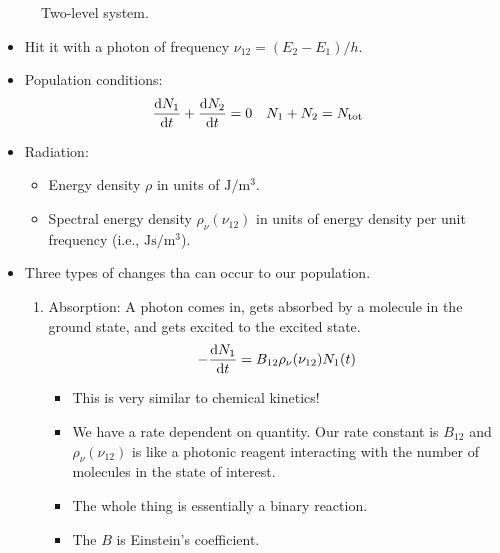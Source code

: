 \documentclass[../notes.tex]{subfiles}
\begin{document}
\begin{itemize}
\begin{figure}[h!]
        \caption{Two-level system.}
        \label{fig:2LevelSystem}
    \end{figure}
    \begin{itemize}
        \item Hit it with a photon of frequency $\nu_{12}=(E_2-E_1)/h$.
        \item Population conditions:
        \begin{align*}
            \dv{N_1}{t}+\dv{N_2}{t} &= 0&
            N_1+N_2 &= N_\text{tot}
        \end{align*}
        \item Radiation:
        \begin{itemize}
            \item Energy density $\rho$ in units of $\si{\joule\per\cubic\meter}$.
            \item Spectral energy density $\rho_\nu(\nu_{12})$ in units of energy density per unit frequency (i.e., $\si{\joule\second\per\cubic\meter}$).
        \end{itemize}
        \item Three types of changes tha can occur to our population.
        \begin{enumerate}
            \item Absorption: A photon comes in, gets absorbed by a molecule in the ground state, and gets excited to the excited state.
            \begin{equation*}
                -\dv{N_1}{t} = B_{12}\rho_\nu(\nu_{12})N_1(t)
            \end{equation*}
            \begin{itemize}
                \item This is very similar to chemical kinetics!
                \item We have a rate dependent on quantity. Our rate constant is $B_{12}$ and $\rho_\nu(\nu_{12})$ is like a photonic reagent interacting with the number of molecules in the state of interest.
                \item The whole thing is essentially a binary reaction.
                \item The $B$ is Einstein's coefficient.
            \end{itemize}

\end{enumerate}
\end{itemize}
\end{itemize}
\end{document}
